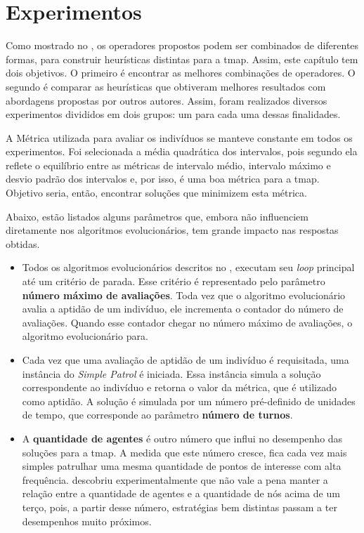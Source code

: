 \chapter{Experimentos}
\label{experimentos}

Como mostrado no , os operadores propostos podem ser 
combinados de diferentes formas, para construir heurísticas distintas para a 
\ac{tmap}. Assim, este capítulo tem dois objetivos. O primeiro é encontrar as 
melhores combinações de operadores. O segundo é comparar as heurísticas que 
obtiveram melhores resultados com abordagens propostas por outros autores. 
Assim, foram realizados diversos experimentos divididos em dois grupos: um para 
cada uma dessas finalidades.

A Métrica utilizada para avaliar os indivíduos se manteve constante em todos 
os experimentos. Foi selecionada a média quadrática dos intervalos, pois segundo 
\citep{sampaiophd} ela reflete o equilíbrio entre as métricas de intervalo 
médio, intervalo máximo e desvio padrão dos intervalos e, por isso, é uma boa 
métrica para a \ac{tmap}. Objetivo seria, então, encontrar soluções que 
minimizem esta métrica.

Abaixo, estão listados alguns parâmetros que, embora não influenciem diretamente 
nos algoritmos evolucionários, tem grande impacto nas respostas obtidas.

\begin{itemize}
	\item Todos os algoritmos evolucionários descritos no , 
	executam seu \textit{loop} principal até um critério de parada. Esse 
	critério é representado pelo parâmetro \textbf{número máximo de avaliações}. 
	Toda vez que o algoritmo evolucionário avalia a aptidão de um indivíduo, ele 
	incrementa o contador do número de avaliações. Quando esse contador chegar 
	no número máximo de avaliações, o algoritmo evolucionário para.
	\item Cada vez que uma avaliação de aptidão de um indivíduo é requisitada, 
	uma instância do \textit{Simple Patrol} é iniciada. Essa instância simula 
	a solução correspondente ao indivíduo e retorna o valor da métrica, que é 
	utilizado como aptidão. A solução é simulada por um número pré-definido de 
	unidades de tempo, que corresponde ao parâmetro \textbf{número de turnos}.
	\item A \textbf{quantidade de agentes} é outro número que influi no 
	desempenho das soluções para a \ac{tmap}. A medida que este número cresce, 
	fica cada vez mais simples patrulhar uma mesma quantidade de pontos de 
	interesse com alta frequência. \citep{sampaiophd} descobriu 
	experimentalmente que não vale a pena manter a relação entre a quantidade de 
	agentes e a quantidade de nós acima de um terço, pois, a partir desse número, 
	estratégias bem distintas passam a ter desempenhos muito próximos.
\end{itemize}

